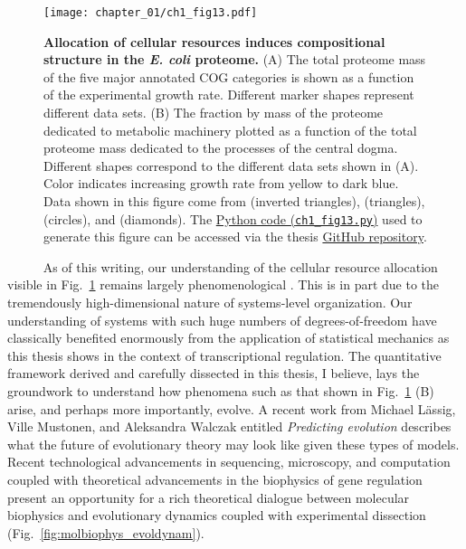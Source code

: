 \documentclass[12pt]{caltech_thesis}
\begin{document}
\hypertarget{fig:proteomics}{%
\begin{figure}
\centering
\texttt{[image: chapter\_01/ch1\_fig13.pdf]}
\caption[{Allocation of cellular resources induces compositional
structure in the \emph{E. coli} proteome.}]{\textbf{Allocation of
cellular resources induces compositional structure in the \emph{E. coli}
proteome.} (A) The total proteome mass of the five major annotated COG
categories is shown as a function of the experimental growth rate.
Different marker shapes represent different data sets. (B) The fraction
by mass of the proteome dedicated to metabolic machinery plotted as a
function of the total proteome mass dedicated to the processes of the
central dogma. Different shapes correspond to the different data sets
shown in (A). Color indicates increasing growth rate from yellow to dark
blue. Data shown in this figure come from \textcite{peebo2015} (inverted
triangles), \textcite{li2014} (triangles), \textcite{schmidt2016}
(circles), and \textcite{valgepea2013} (diamonds). The
\href{https://github.com/gchure/phd/blob/master/src/chapter_01/code/ch1_fig13.py}{Python
code (\texttt{ch1\_fig13.py})} used to generate this figure can be
accessed via the thesis \href{https://github.com/gchure/phd}{GitHub
repository}.}
\label{fig:proteomics}
\end{figure}
}

~~~~~ As of this writing, our understanding of the cellular resource
allocation visible in Fig.~\ref{fig:proteomics} remains largely
phenomenological \autocite{scott2014}. This is in part due to the
tremendously high-dimensional nature of systems-level organization. Our
understanding of systems with such huge numbers of degrees-of-freedom
have classically benefited enormously from the application of
statistical mechanics as this thesis shows in the context of
transcriptional regulation. The quantitative framework derived and
carefully dissected in this thesis, I believe, lays the groundwork to
understand how phenomena such as that shown in Fig.~\ref{fig:proteomics}
(B) arise, and perhaps more importantly, evolve. A recent work from
Michael Lässig, Ville Mustonen, and Aleksandra Walczak entitled
\emph{Predicting evolution} \autocite{lassig2017} describes what the
future of evolutionary theory may look like given these types of models.
Recent technological advancements in sequencing, microscopy, and
computation coupled with theoretical advancements in the biophysics of
gene regulation present an opportunity for a rich theoretical dialogue
between molecular biophysics and evolutionary dynamics coupled with
experimental dissection (Fig.~\ref{fig:molbiophys_evoldynam}).
\end{document}
